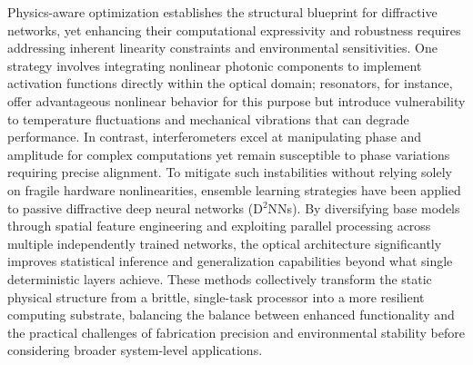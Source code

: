 \documentclass[11pt]{article}
\begin{document}
Physics-aware optimization establishes the structural blueprint for diffractive networks, yet enhancing their computational expressivity and robustness requires addressing inherent linearity constraints and environmental sensitivities. One strategy involves integrating nonlinear photonic components to implement activation functions directly within the optical domain; resonators, for instance, offer advantageous nonlinear behavior for this purpose but introduce vulnerability to temperature fluctuations and mechanical vibrations that can degrade performance. In contrast, interferometers excel at manipulating phase and amplitude for complex computations yet remain susceptible to phase variations requiring precise alignment. To mitigate such instabilities without relying solely on fragile hardware nonlinearities, ensemble learning strategies have been applied to passive diffractive deep neural networks (D\(^{2}\)NNs). By diversifying base models through spatial feature engineering and exploiting parallel processing across multiple independently trained networks, the optical architecture significantly improves statistical inference and generalization capabilities beyond what single deterministic layers achieve. These methods collectively transform the static physical structure from a brittle, single-task processor into a more resilient computing substrate, balancing the balance between enhanced functionality and the practical challenges of fabrication precision and environmental stability before considering broader system-level applications. \citep{doi_10_3390_nano14080697_c372a140} \citep{doi_10_1038_s41377_020_00446_w_c890b40c}
\end{document}
